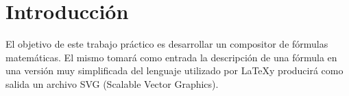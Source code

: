 \section{Introducci\'on}
El objetivo de este trabajo pr\'actico es desarrollar un compositor de f\'ormulas matem\'aticas. El mismo tomar\'a como entrada la descripci\'on de una f\'ormula en una versi\'on muy simplificada del lenguaje utilizado por \LaTeX \hspace{0.1cm}y producir\'a como salida un archivo SVG (Scalable Vector Graphics).